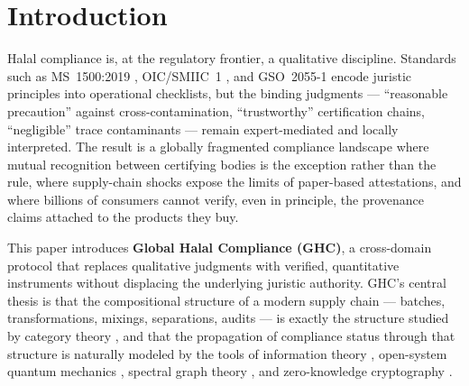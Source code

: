 \section{Introduction}
\label{sec:intro}

Halal compliance is, at the regulatory frontier, a qualitative discipline.
Standards such as MS~1500:2019 \cite{ms1500}, OIC/SMIIC~1 \cite{smiic1}, and
GSO~2055-1 \cite{gso2055} encode juristic principles into operational
checklists, but the binding judgments --- ``reasonable precaution'' against
cross-contamination, ``trustworthy'' certification chains, ``negligible''
trace contaminants --- remain expert-mediated and locally interpreted. The
result is a globally fragmented compliance landscape where mutual
recognition between certifying bodies is the exception rather than the
rule, where supply-chain shocks expose the limits of paper-based
attestations, and where billions of consumers cannot verify, even in
principle, the provenance claims attached to the products they buy.

This paper introduces \textbf{Global Halal Compliance (GHC)}, a
cross-domain protocol that replaces qualitative judgments with verified,
quantitative instruments without displacing the underlying juristic
authority. GHC's central thesis is that the compositional structure of a
modern supply chain --- batches, transformations, mixings, separations,
audits --- is exactly the structure studied by category theory
\cite{maclane,fongspivak}, and that the propagation of compliance status
through that structure is naturally modeled by the tools of information
theory \cite{covertom}, open-system quantum mechanics \cite{nielsenchuang},
spectral graph theory \cite{chung}, and zero-knowledge cryptography
\cite{gmr1989,groth16}.

